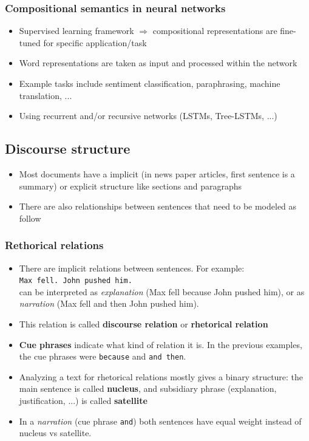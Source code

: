\subsubsection{Compositional semantics in neural networks}
\begin{itemize}
	\item Supervised learning framework $\Rightarrow$ compositional representations are fine-tuned for specific application/task
	\item Word representations are taken as input and processed within the network
	\item Example tasks include sentiment classification, paraphrasing, machine translation, ...
	\item Using recurrent and/or recursive networks (LSTMs, Tree-LSTMs, ...)
\end{itemize}
\subsection{Discourse structure}
\begin{itemize}
	\item Most documents have a implicit (in news paper articles, first sentence is a summary) or explicit structure like sections and paragraphs
	\item There are also relationships between sentences that need to be modeled as follow
\end{itemize}
\subsubsection{Rethorical relations}
\begin{itemize}
	\item There are implicit relations between sentences. For example:\\
	\texttt{Max fell. John pushed him.}\\
	can be interpreted as \textit{explanation} (Max fell because John pushed him), or as \textit{narration} (Max fell and then John pushed him).
	\item This relation is called \textbf{discourse relation} or \textbf{rhetorical relation}
	\item \textbf{Cue phrases} indicate what kind of relation it is. In the previous examples, the cue phrases were \texttt{because} and \texttt{and then}.
	\item Analyzing a text for rhetorical relations mostly gives a binary structure: the main sentence is called \textbf{nucleus}, and subsidiary phrase (explanation, justification, ...) is called \textbf{satellite}
	\item In a \textit{narration} (cue phrase \texttt{and}) both sentences have equal weight instead of nucleus vs satellite.
\end{itemize}
